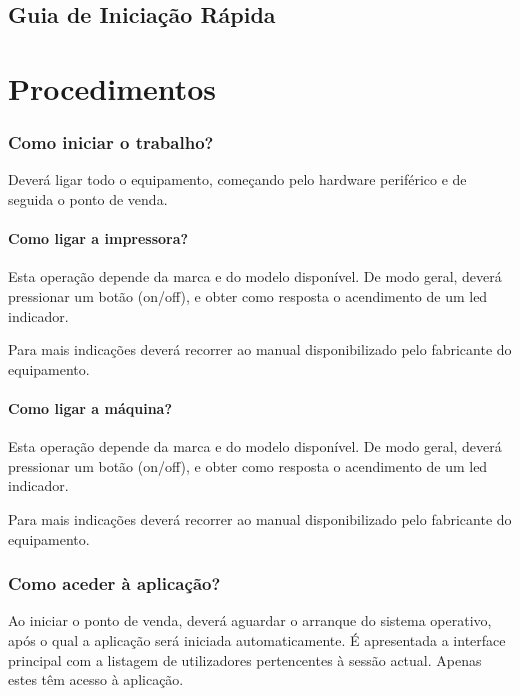 \documentclass[a4paper,11pt,openany]{memoir}
\begin{document}
\chapter{Guia de Iniciação Rápida}  %




\newpage



\newpage



\part{Procedimentos}


\section{Como iniciar o trabalho?}
Deverá ligar todo o equipamento, começando pelo hardware periférico e de seguida
o ponto de venda.
\subsection{Como ligar a impressora?}
Esta operação depende da marca e do modelo disponível. De modo geral, deverá
pressionar um botão (on/off), e obter como resposta o acendimento de um led
indicador.

Para mais indicações deverá recorrer ao manual disponibilizado pelo fabricante do
equipamento.

\subsection{Como ligar a máquina?}
Esta operação depende da marca e do modelo disponível. De modo geral, deverá
pressionar um botão (on/off), e obter como resposta o acendimento de um led
indicador.

Para mais indicações deverá recorrer ao manual disponibilizado pelo fabricante do
equipamento.

\section{Como aceder à aplicação?}

Ao iniciar o ponto de venda, deverá aguardar o arranque do sistema operativo, após
o qual a aplicação será iniciada automaticamente. É apresentada a interface
principal com a listagem de utilizadores pertencentes à sessão actual. Apenas estes
têm acesso à aplicação.
\end{document}
